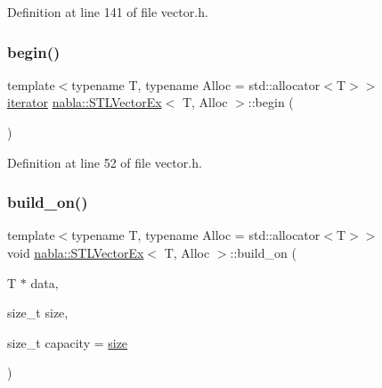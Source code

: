Definition at line 141 of file vector.\+h.

\mbox{\label{classnabla_1_1_s_t_l_vector_ex_a01d7928bf1a4aa33e6e147df5c9a2f63}} 
\subsubsection{\texorpdfstring{begin()}{begin()}}
{\footnotesize\ttfamily template$<$typename T, typename Alloc = std\+::allocator$<$\+T$>$$>$ \\
\mbox{\hyperlink{classnabla_1_1_s_t_l_vector_ex_a4bd3bc9bbe369d76e958f3180c22f40b}{iterator}} \mbox{\hyperlink{classnabla_1_1_s_t_l_vector_ex}{nabla\+::\+S\+T\+L\+Vector\+Ex}}$<$ T, Alloc $>$\+::begin (\begin{DoxyParamCaption}{ }\end{DoxyParamCaption})\hspace{0.3cm}{\ttfamily [inline]}}



Definition at line 52 of file vector.\+h.

\mbox{\label{classnabla_1_1_s_t_l_vector_ex_a6825a8f0e938ff22f851d047f362f1dd}} 
\subsubsection{\texorpdfstring{build\_on()}{build\_on()}}
{\footnotesize\ttfamily template$<$typename T, typename Alloc = std\+::allocator$<$\+T$>$$>$ \\
void \mbox{\hyperlink{classnabla_1_1_s_t_l_vector_ex}{nabla\+::\+S\+T\+L\+Vector\+Ex}}$<$ T, Alloc $>$\+::build\+\_\+on (\begin{DoxyParamCaption}\item[{T $\ast$}]{data,  }\item[{size\+\_\+t}]{size,  }\item[{size\+\_\+t}]{capacity = {\ttfamily \mbox{\hyperlink{classnabla_1_1_s_t_l_vector_ex_a1b4a4d968613137772046331b1264e1f}{size}}} }\end{DoxyParamCaption})\hspace{0.3cm}{\ttfamily [inline]}}

